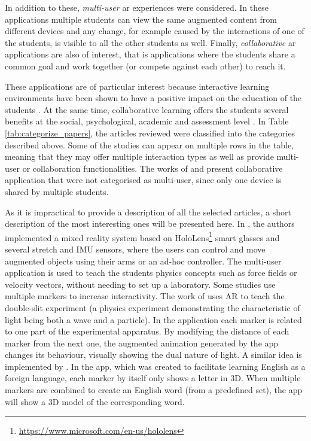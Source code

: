 In addition to these, \emph{multi-user} \gls{ar} experiences were considered. In these applications multiple students can view the same augmented content from different devices and any change, for example caused by the interactions of one of the students, is visible to all the other students as well.
Finally, \emph{collaborative} \gls{ar} applications are also of interest, that is applications where the students share a common goal and work together (or compete against each other) to reach it.

These applications are of particular interest because interactive learning environments have been shown to have a positive impact on the education of the students \citep{johnson2000animated}. At the same time, collaborative learning offers the students several benefits at the social, psychological, academic and assessment level \citep{laal2012benefits}. In Table \ref{tab:categorize_papers}, the \papersSelected articles reviewed were classified into the categories described above. Some of the studies can appear on multiple rows in the table, meaning that they may offer multiple interaction types as well as provide multi-user or collaboration functionalities. The works of \cite{tscholl2016designing} and \cite{ManriqueJuan2017APA} present collaborative application that were not categorised as multi-user, since only one device is shared by multiple students.

As it is impractical to provide a description of all the selected articles, a short description of the most interesting ones will be presented here. In \cite{khan2018mathland}, the authors implemented a mixed reality system based on HoloLens\footnote{\url{https://www.microsoft.com/en-us/hololens}} smart glasses and several stretch and \gls{IMU} sensors, where the users can control and move augmented objects using their arms or an ad-hoc controller. The multi-user application is used to teach the students physics concepts such as force fields or velocity vectors, without needing to set up a laboratory. Some studies use multiple markers to increase interactivity. The work of \cite{wang2018augmented} uses AR to teach the double-slit experiment (a physics experiment demonstrating the characteristic of light being both a wave and a particle). In the application each marker is related to one part of the experimental apparatus. By modifying the distance of each marker from the next one, the augmented animation generated by the app changes its behaviour, visually showing the dual nature of light. A similar idea is implemented by \cite{boonbrahm2015using}. In the app, which was created to facilitate learning English as a foreign language, each marker by itself only shows a letter in 3D. When multiple markers are combined to create an English word (from a predefined set), the app will show a 3D model of the corresponding word.

